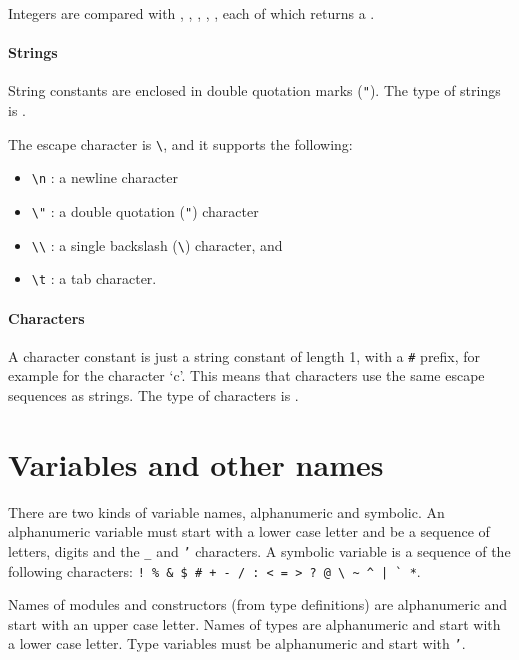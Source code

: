 \documentclass[12pt,a4paper]{book}
\begin{document}
Integers are compared with \smlinline{=}, \smlinline{<}, \smlinline{>}, \smlinline{<=}, \smlinline{>=}, each of which returns a .

\paragraph{Strings} String constants are enclosed in double quotation marks (\texttt{"}). The type of strings is .

The escape character is \verb|\|, and it supports the following:
\begin{itemize}
\item
\verb|\n| : a newline character
\item
\verb|\"| : a double quotation (\texttt{"}) character
\item
\verb|\\| : a single backslash (\verb|\|) character, and
\item
\verb|\t| : a tab character.
\end{itemize}


\paragraph{Characters} A character constant is just a string constant of length
1, with a \texttt{\#} prefix, for example  for the character `c'.
This means that characters use the same escape sequences as strings. The type
of characters is .


\section{Variables and other names}

There are two kinds of variable names, alphanumeric and symbolic. An alphanumeric variable must start
with a lower case letter and be a sequence of letters, digits and the \texttt{\_} and \texttt{'} characters. A symbolic variable is a sequence of the following characters: \verb)! % & $ # + - / : < = > ? @ \ ~ ^ | ` *).

Names of modules and constructors (from type definitions) are alphanumeric and
start with an upper case letter. Names of types are alphanumeric and start
with a lower case letter.
%
Type variables must be alphanumeric and start with \texttt{'}.
\end{document}
